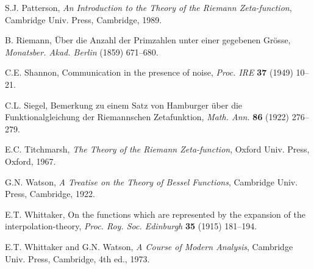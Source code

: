 \documentclass[11pt]{article}
\theoremstyle{plain}
\begin{document}
\begin{thebibliography}{99}
S.J. Patterson, \textit{An Introduction to the Theory of the Riemann Zeta-function}, Cambridge Univ. Press, Cambridge, 1989.

B. Riemann, Über die Anzahl der Primzahlen unter einer gegebenen Grösse, \textit{Monatsber. Akad. Berlin} (1859) 671--680.

C.E. Shannon, Communication in the presence of noise, \textit{Proc. IRE} \textbf{37} (1949) 10--21.

C.L. Siegel, Bemerkung zu einem Satz von Hamburger über die Funktionalgleichung der Riemannschen Zetafunktion, \textit{Math. Ann.} \textbf{86} (1922) 276--279.

E.C. Titchmarsh, \textit{The Theory of the Riemann Zeta-function}, Oxford Univ. Press, Oxford, 1967.

G.N. Watson, \textit{A Treatise on the Theory of Bessel Functions}, Cambridge Univ. Press, Cambridge, 1922.

E.T. Whittaker, On the functions which are represented by the expansion of the interpolation-theory, \textit{Proc. Roy. Soc. Edinburgh} \textbf{35} (1915) 181--194.

E.T. Whittaker and G.N. Watson, \textit{A Course of Modern Analysis}, Cambridge Univ. Press, Cambridge, 4th ed., 1973.

\end{thebibliography}
\end{document}
